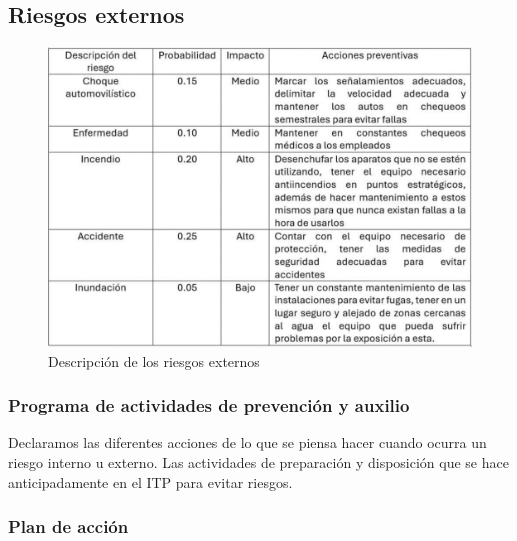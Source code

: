     \subsection{Riesgos externos}
    
    \begin{figure}[H]
        \centering
        \includegraphics[trim = {1mm 1mm 1mm 1mm},clip,scale=0.3]{8/Img/Riesgos.pdf}
        \caption{Descripción de los riesgos externos}
        \label{Riesgos externos}
    \end{figure}
    \subsubsection{Programa de actividades de prevención y auxilio}
    
    Declaramos las diferentes acciones de lo que se piensa hacer cuando ocurra un riesgo interno u externo. 
    Las actividades de preparación y disposición que se hace anticipadamente en el ITP para evitar riesgos.
    \subsubsection{Plan de acción}
    
